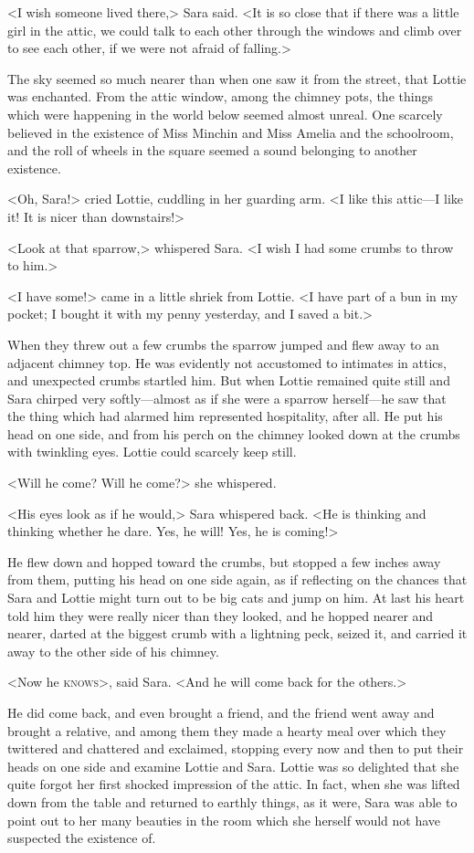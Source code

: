 <I wish someone lived there,> Sara said. <It is so close that if there was a little girl in the attic, we could talk to each other through the windows and climb over to see each other, if we were not afraid of falling.>

The sky seemed so much nearer than when one saw it from the street, that Lottie was enchanted. From the attic window, among the chimney pots, the things which were happening in the world below seemed almost unreal. One scarcely believed in the existence of Miss Minchin and Miss Amelia and the schoolroom, and the roll of wheels in the square seemed a sound belonging to another existence.

<Oh, Sara!> cried Lottie, cuddling in her guarding arm. <I like this attic—I like it! It is nicer than downstairs!>

<Look at that sparrow,> whispered Sara. <I wish I had some crumbs to throw to him.>

<I have some!> came in a little shriek from Lottie. <I have part of a bun in my pocket; I bought it with my penny yesterday, and I saved a bit.>

When they threw out a few crumbs the sparrow jumped and flew away to an adjacent chimney top. He was evidently not accustomed to intimates in attics, and unexpected crumbs startled him. But when Lottie remained quite still and Sara chirped very softly—almost as if she were a sparrow herself—he saw that the thing which had alarmed him represented hospitality, after all. He put his head on one side, and from his perch on the chimney looked down at the crumbs with twinkling eyes. Lottie could scarcely keep still.

<Will he come? Will he come?> she whispered.

<His eyes look as if he would,> Sara whispered back. <He is thinking and thinking whether he dare. Yes, he will! Yes, he is coming!>

He flew down and hopped toward the crumbs, but stopped a few inches away from them, putting his head on one side again, as if reflecting on the chances that Sara and Lottie might turn out to be big cats and jump on him. At last his heart told him they were really nicer than they looked, and he hopped nearer and nearer, darted at the biggest crumb with a lightning peck, seized it, and carried it away to the other side of his chimney.

<Now he \textsc{knows}>, said Sara. <And he will come back for the others.>

He did come back, and even brought a friend, and the friend went away and brought a relative, and among them they made a hearty meal over which they twittered and chattered and exclaimed, stopping every now and then to put their heads on one side and examine Lottie and Sara. Lottie was so delighted that she quite forgot her first shocked impression of the attic. In fact, when she was lifted down from the table and returned to earthly things, as it were, Sara was able to point out to her many beauties in the room which she herself would not have suspected the existence of.

